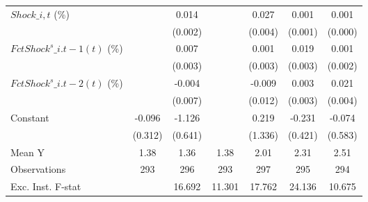 {\begin{tabular}{l*{6}{c}}
\addlinespace
$ Shock\_{i,t}$ (\%) &                     &       0.014\sym{***}&                     &       0.027\sym{***}&       0.001         &       0.001         \\
                    &                     &     (0.002)         &                     &     (0.004)         &     (0.001)         &     (0.000)         \\
\addlinespace
$ FctShock^s\_{i.t-1}(t)$ (\%)&                     &       0.007\sym{*}  &                     &       0.001         &       0.019\sym{***}&       0.001         \\
                    &                     &     (0.003)         &                     &     (0.003)         &     (0.003)         &     (0.002)         \\
\addlinespace
$ FctShock^s\_{i.t-2}(t)$ (\%)&                     &      -0.004         &                     &      -0.009         &       0.003         &       0.021\sym{***}\\
                    &                     &     (0.007)         &                     &     (0.012)         &     (0.003)         &     (0.004)         \\
\addlinespace
Constant            &      -0.096         &      -1.126\sym{*}  &                     &       0.219         &      -0.231         &      -0.074         \\
                    &     (0.312)         &     (0.641)         &                     &     (1.336)         &     (0.421)         &     (0.583)         \\
\midrule
Mean Y              &        1.38         &        1.36         &        1.38         &        2.01         &        2.31         &        2.51         \\
Observations        &         293         &         296         &         293         &         297         &         295         &         294         \\
Exc. Inst. F-stat   &                     &      16.692         &      11.301         &      17.762         &      24.136         &      10.675         \\
\bottomrule
\end{tabular}
}
